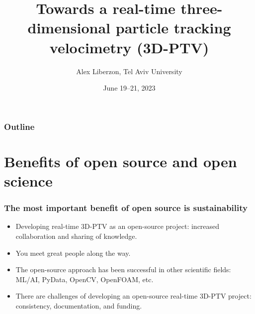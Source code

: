 \documentclass[preprint, aspectratio=43]{beamer}
\title{Towards a real-time three-dimensional particle tracking velocimetry (3D-PTV)}
\date{June 19--21, 2023}
\author[Liberzon]{Alex Liberzon, Tel Aviv University}
\begin{document}
\begin{frame}
    \titlepage
\end{frame}

\begin{frame}\frametitle{Outline}
    \begin{card}	
    \tableofcontents
    \end{card}
\end{frame}














\section{Benefits of open source and open science}

\begin{frame}
\frametitle{The most important benefit of open source is sustainability}
\begin{itemize}
\item Developing real-time 3D-PTV as an open-source project: increased collaboration and sharing of knowledge. 
\item You meet great people along the way.
\item The open-source approach has been successful in other scientific fields: ML/AI, PyData, OpenCV, OpenFOAM, etc.
\item There are challenges of developing an open-source real-time 3D-PTV project: consistency, documentation, and funding.
\end{itemize}
\end{frame}


\end{document}
